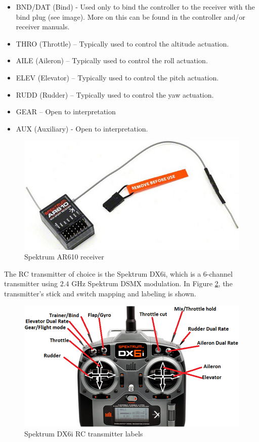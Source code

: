 \documentclass[a4paper]{report}
\begin{document}
\begin{itemize}
  \item BND/DAT (Bind) - Used only to bind the controller to the receiver with the bind plug (see image). More on this can be found in the controller and/or receiver manuals.
  \item THRO (Throttle) – Typically used to control the altitude actuation.
  \item AILE (Aileron) – Typically used to control the roll actuation.
  \item ELEV (Elevator) – Typically used to control the pitch actuation.
  \item RUDD (Rudder) – Typically used to control the yaw actuation.
  \item GEAR – Open to interpretation
  \item AUX (Auxiliary) - Open to interpretation.
\end{itemize}

\begin{figure}[h]
    \centering
    \includegraphics[scale=0.8]{images/ar610.png}
    \caption{Spektrum AR610 receiver}
    \label{fig:ar610}
\end{figure}

The RC transmitter of choice is the Spektrum DX6i, which is a 6-channel transmitter using $2.4$ GHz Spektrum DSMX modulation. In Figure \ref{fig:dx6i_map}, the transmitter's stick and switch mapping and labeling is shown.

\begin{figure}[h]
    \centering
    \includegraphics[scale=0.6]{images/dx6i_map.png}
    \caption{Spektrum DX6i RC transmitter labels}
    \label{fig:dx6i_map}
\end{figure}
\end{document}
